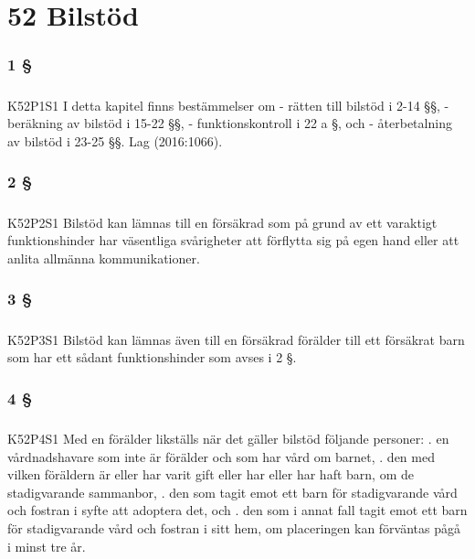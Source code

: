 \documentclass[a4paper,notitlepage,openany,10pt]{book}
\begin{document}
\chapter*{52 Bilstöd}
\subsection*{1 §}
\paragraph*{}
{\tiny K52P1S1}
I detta kapitel finns bestämmelser om
\newline - rätten till bilstöd i 2-14 §§,
\newline - beräkning av bilstöd i 15-22 §§,
\newline - funktionskontroll i 22 a §, och
\newline - återbetalning av bilstöd i 23-25 §§.
Lag (2016:1066).
\subsection*{2 §}
\paragraph*{}
{\tiny K52P2S1}
Bilstöd kan lämnas till en försäkrad som på grund av ett varaktigt funktionshinder har väsentliga svårigheter att förflytta sig på egen hand eller att anlita allmänna kommunikationer.
\subsection*{3 §}
\paragraph*{}
{\tiny K52P3S1}
Bilstöd kan lämnas även till en försäkrad förälder till ett försäkrat barn som har ett sådant funktionshinder som avses i 2 §.
\subsection*{4 §}
\paragraph*{}
{\tiny K52P4S1}
Med en förälder likställs när det gäller bilstöd följande personer:
. en vårdnadshavare som inte är förälder och som har vård om barnet,
. den med vilken föräldern är eller har varit gift eller har eller har haft barn, om de stadigvarande sammanbor,
. den som tagit emot ett barn för stadigvarande vård och fostran i syfte att adoptera det, och
. den som i annat fall tagit emot ett barn för stadigvarande vård och fostran i sitt hem, om placeringen kan förväntas pågå i minst tre år.
\end{document}
